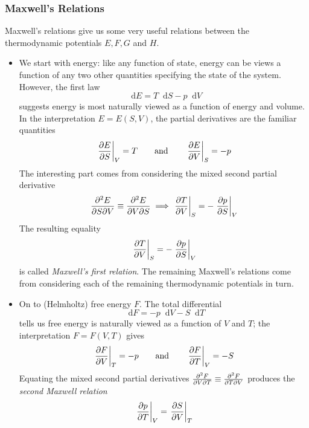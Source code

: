 \documentclass[11pt, a4paper]{article}
\newcommand{\diff}{\mathop{}\!\mathrm{d}} %
\begin{document}
\subsubsection{Maxwell's Relations}
Maxwell's relations give us some very useful relations between the thermodynamic potentials $ E, F, G $ and $ H $.
\begin{itemize}
	\item We start with energy: like any function of state, energy can be views a function of any two other quantities specifying the state of the system. However, the first law 
	\begin{equation*}
		 \diff E = T \diff S - p \diff V 
	\end{equation*}
	suggests energy is most naturally viewed as a function of energy and volume. In the interpretation $ E = E(S, V) $, the partial derivatives are the familiar quantities
	\begin{equation*}
		\eval{\pdv{E}{S}}_{V} = T \qquad \text{and} \qquad \eval{\pdv{E}{V}}_{S} = - p
	\end{equation*}
	The interesting part comes from considering the mixed second partial derivative
	\begin{equation*}
		\pdv{E}{S}{V} \equiv \pdv{E}{V}{S} \implies \eval{\pdv{T}{V}}_{S} = - \eval{\pdv{p}{S}}_{V}
	\end{equation*}
	The resulting equality 
	\begin{equation*}
		\eval{\pdv{T}{V}}_{S} = - \eval{\pdv{p}{S}}_{V}
	\end{equation*}
	is called \textit{Maxwell's first relation}. The remaining Maxwell's relations come from considering each of the remaining thermodynamic potentials in turn.
	
	\item On to (Helmholtz) free energy $ F $. The total differential
	\begin{equation*}
		\diff F = - p \diff V - S \diff T
	\end{equation*}
	tells us free energy is naturally viewed as a function of $ V $ and $ T $; the interpretation $ F = F(V, T) $ gives
	\begin{equation*}
		\eval{\pdv{F}{V}}_{T} = - p \qquad \text{and} \qquad \eval{\pdv{F}{T}}_{V} = - S
	\end{equation*}
	Equating the mixed second partial derivatives $ \pdv{F}{V}{T} \equiv \pdv{F}{T}{V} $ produces the \textit{second Maxwell relation}
	\begin{equation*}
		\eval{\pdv{p}{T}}_{V} = \eval{\pdv{S}{V}}_{T}
	\end{equation*}
	

\end{itemize}
\end{document}
